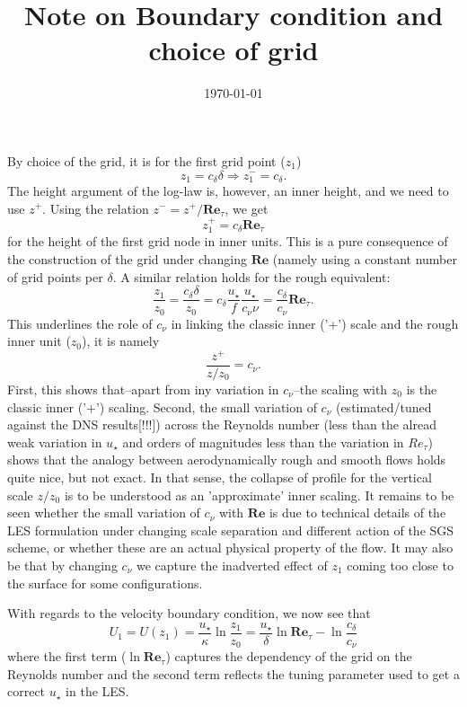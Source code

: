 \documentclass[a4paper,1pt]{amsart}
\date{\today}
\title{Note on Boundary condition and choice of grid}
\newcommand{\RE}{\mathbf{Re}}
\begin{document}
\noindent By choice of the grid, it is for the first grid point ($z_1$)
\[ z_1 = c_\delta \delta \Rightarrow z_1^{-}=c_\delta.\]
The height argument of the log-law is, however, an inner height, and we need to use $z^+$.
Using the relation $z^-=z^+/\RE_\tau$, we get 
\[ z_{1}^{+} = c_\delta \RE_\tau\] 
for the height of the first grid node in inner units.
%
This is a pure consequence of the construction of the grid under changing $\RE$ (namely using a constant number of grid points per $\delta$.
%
A similar relation holds for the rough equivalent:
\[ \frac{z_1}{z_0} = \frac{c_\delta \delta}{z_0} = c_\delta \frac{u_\star}{f} \frac{u_\star}{c_\nu \nu} = \frac{c_\delta}{c_\nu} \RE_\tau.\]
This underlines the role of $c_\nu$ in linking the classic inner ('+') scale and the rough inner unit ($z_0$), it is namely
\[ \frac{z^+}{z/z_0} = c_\nu.\]
First, this shows that--apart from iny variation in $c_\nu$--the scaling with $z_0$ is the classic inner ('+') scaling.
%
Second, the small variation of $c_\nu$ (estimated/tuned against the DNS results[!!!])
across the Reynolds number (less than the alread weak variation in $u_\star$
and orders of magnitudes less than the variation in $Re_\tau$) shows that the analogy between aerodynamically rough
and smooth flows holds quite nice, but not exact.
%
In that sense, the collapse of profile for the vertical scale $z/z_0$ is to be understood as an 'approximate' inner scaling. 
%
It remains to be seen whether the small variation of $c_\nu$ with $\RE$ is due to technical details of the LES formulation under changing
scale separation and different action of the SGS scheme, or whether these are an actual physical property of the flow.
%
It may also be that by changing $c_\nu$ we capture the inadverted effect of $z_1$ coming too close to the surface for
some configurations. 
%
\par
%
With regards to the velocity boundary condition, we now see that
\[U_1=U(z_1) = \frac{u_\star}{\kappa} \ln \frac{z_1}{z_0}  = \frac{u_\star}{\delta} \ln\RE_\tau - \ln\frac{c_\delta}{c_\nu}\]
where the first term ($\ln\RE_\tau$) captures the dependency of the grid on the Reynolds number and the second term reflects the tuning parameter
used to get a correct $u_\star$ in the LES.
%
\par
%
\end{document}
